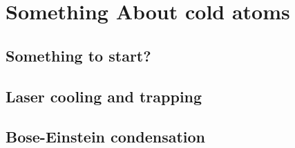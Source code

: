 
\renewcommand{\thechapter}{2}

\chapter{Something About cold atoms}

\section{Something to start?}

\section{Laser cooling and trapping}

\section{Bose-Einstein condensation}



